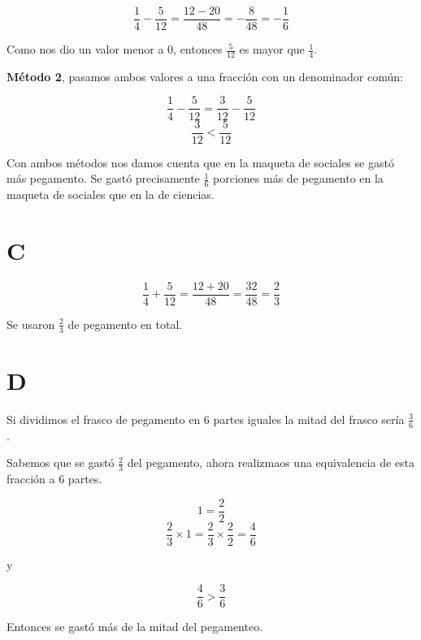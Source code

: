 \documentclass[12pt, letterpaper, twoside]{article}
\begin{document}
\[ \frac{1}{4} - \frac{5}{12} = \frac{12 - 20}{48} = -\frac{8}{48} = -\frac{1}{6} \]

Como nos dio un valor menor a $0$, entonces $\frac{5}{12}$ es mayor que
$\frac{1}{4}$.

\textbf{Método 2}, pasamos ambos valores a una fracción con un denominador común:

\[ \frac{1}{4} - \frac{5}{12} = \frac{3}{12} - \frac{5}{12} \]
\[ \frac{3}{12} < \frac{5}{12} \]

Con ambos métodos nos damos cuenta que en la maqueta de sociales se gastó más
pegamento. Se gastó precisamente $\frac{1}{6}$ porciones más de pegamento en la
maqueta de sociales que en la de ciencias.

\section*{C}
\[ \frac{1}{4} + \frac{5}{12} = \frac{12 + 20}{48} = \frac{32}{48} = \frac{2}{3} \]

Se usaron $\frac{2}{3}$ de pegamento en total.

\section*{D}
Si dividimos el frasco de pegamento en 6 partes iguales la mitad del frasco
sería $\frac{3}{6}$.

Sabemos que se gastó $\frac{2}{3}$ del pegamento, ahora realizmaos una
equivalencia de esta fracción a 6 partes.

\[ 1 = \frac{2}{2} \]
\[ \frac{2}{3} \times 1 = \frac{2}{3} \times \frac{2}{2} = \frac{4}{6} \]

y

\[ \frac{4}{6} > \frac{3}{6} \]

Entonces se gastó más de la mitad del pegamenteo.
\end{document}
